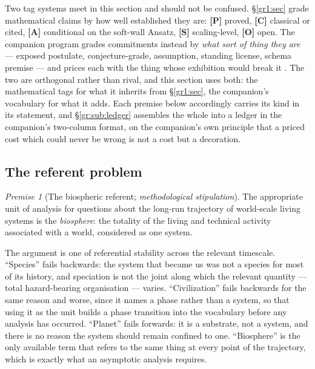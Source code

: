 \documentclass[11pt]{article}
\numberwithin{equation}{section}
\theoremstyle{plain}
\theoremstyle{definition}
\theoremstyle{remark}
\newtheorem{premise}{Premise}
\begin{document}
Two tag systems meet in this section and should not be confused.
\S\ref{gr1:sec} grade mathematical claims by how well established they
are: \textbf{[P]} proved, \textbf{[C]} classical or cited, \textbf{[A]}
conditional on the soft-wall Ansatz, \textbf{[S]} scaling-level,
\textbf{[O]} open. The companion program grades commitments instead by
\emph{what sort of thing they are} --- exposed postulate,
conjecture-grade, assumption, standing license, schema premise --- and
prices each with the thing whose exhibition would break it
\cite{Ben24Nexus, Ben26Found, Ben26Optimal}. The two are orthogonal
rather than rival, and this section uses both: the mathematical tags for
what it inherits from \S\ref{gr1:sec}, the companion's vocabulary for what
it adds. Each premise below accordingly carries its kind in its
statement, and \S\ref{gr:sub:ledger} assembles the whole into a ledger
in the companion's two-column format, on the companion's own principle
that a priced cost which could never be wrong is not a cost but a
decoration.

\subsection{The referent problem}\label{gr:sub:referent}

\begin{premise}[The biospheric referent; \emph{methodological
stipulation}]\label{gr:phi1}
The appropriate unit of analysis for questions about the long-run
trajectory of world-scale living systems is the \emph{biosphere}: the
totality of the living and technical activity associated with a world,
considered as one system.
\end{premise}

The argument is one of referential stability across the relevant
timescale. ``Species'' fails backwards: the system that became us was
not a species for most of its history, and speciation is not the joint
along which the relevant quantity --- total hazard-bearing organisation
--- varies. ``Civilization'' fails backwards for the same reason and
worse, since it names a phase rather than a system, so that using it as
the unit builds a phase transition into the vocabulary before any
analysis has occurred. ``Planet'' fails forwards: it is a substrate, not
a system, and there is no reason the system should remain confined to
one. ``Biosphere'' is the only available term that refers to the same
thing at every point of the trajectory, which is exactly what an
asymptotic analysis requires.
\end{document}

